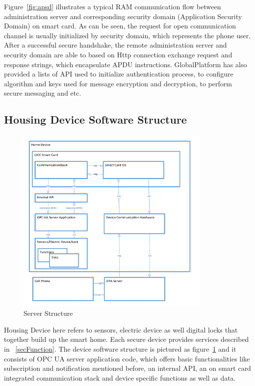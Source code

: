 Figure~\ref{fig:apsd} illustrates a typical RAM communication flow between administration server and corresponding security domain (Application Security Domain) on smart card. As can be seen, the request for open communication channel is usually initialized by security domain, which represents the phone user. After a successful secure handshake, the remote administration server and security domain are able to based on Http connection exchange request and response strings, which encapsulate APDU instructions. GlobalPlatform has also provided  a lists of API used to initialize authentication process, to configure algorithm and keys used for message encryption and decryption, to perform secure messaging and etc.

\subsection{Housing Device Software Structure}

\begin{figure}[!htbp]
	\centering
	\includegraphics[width=0.85\textwidth]{serverStructure}
		\caption{Server Structure}
	\label{fig:serverStructure}
\end{figure}
Housing Device here refers to sensors, electric device as well digital locks that together build up the smart home. Each secure device provides services described in ~\ref{secFunction}. The device software structure is pictured as figure~\ref{fig:serverStructure} and it consists of OPC UA server application code, which offers basic functionalities like subscription and notification mentioned before, an internal API, an on smart card integrated communication stack and device specific functions as well as data.

